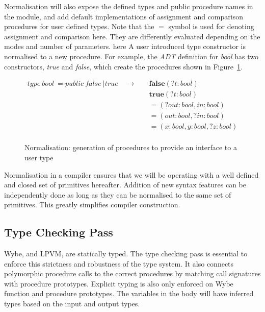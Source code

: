 Normalisation will also expose the defined types and public procedure names in
the module, and add default implementations of assignment and comparison
procedures for user defined types. Note that the $=$ symbol is used for denoting
assignment and comparison here. They are differently evaluated depending on the
modes and number of parameters. here A user introduced type constructor is
normalised to a new procedure. For example, the \textit{ADT} definition for
\textit{bool} has two constructors, \textit{true} and \textit{false}, which
create the procedures shown in Figure~\ref{fig:proc_types}.

\begin{figure}
\begin{align*}
  type\ bool\ = public\ false\ \vert true
  \quad \rightarrow & \quad
                      \mathbf{false}(?t:bool) \\
                    & \quad
                      \mathbf{true}(?t:bool) \\
                    & \quad
                      \mathbf{=}(?out:bool, in:bool) \\
                    & \quad
                      \mathbf{=}(out:bool, ?in:bool) \\
                    & \quad
                      \mathbf{=}(x:bool, y:bool, ?z:bool) \\
\end{align*}
\caption{Normalisation: generation of procedures to provide an interface to a
  user type}
\label{fig:proc_types}
\end{figure}

Normalisation in a compiler ensures that we will be operating with a well
defined and closed set of primitives hereafter. Addition of new syntax features
can be independently done as long as they can be normalised to the same set of
primitives. This greatly simplifies compiler construction.

\subsection{Type Checking Pass}

Wybe, and LPVM, are statically typed. The type checking pass is essential to
enforce this strictness and robustness of the type system. It also connects
polymorphic procedure calls to the correct procedures by matching call
signatures with procedure prototypes. Explicit typing is also only enforced on
Wybe function and procedure prototypes. The variables in the body will have
inferred types based on the input and output types.

